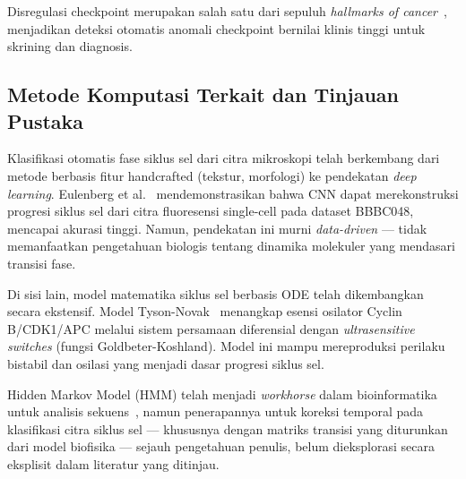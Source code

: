 \documentclass[conference]{IEEEtran}
\begin{document}
Disregulasi checkpoint merupakan salah satu dari sepuluh \textit{hallmarks of cancer}~\cite{hanahan2011}, menjadikan deteksi otomatis anomali checkpoint bernilai klinis tinggi untuk skrining dan diagnosis.

\subsection{Metode Komputasi Terkait dan Tinjauan Pustaka}

Klasifikasi otomatis fase siklus sel dari citra mikroskopi telah berkembang dari metode berbasis fitur handcrafted (tekstur, morfologi) ke pendekatan \textit{deep learning}. Eulenberg et al.~\cite{eulenberg2017} mendemonstrasikan bahwa CNN dapat merekonstruksi progresi siklus sel dari citra fluoresensi single-cell pada dataset BBBC048, mencapai akurasi tinggi. Namun, pendekatan ini murni \textit{data-driven} --- tidak memanfaatkan pengetahuan biologis tentang dinamika molekuler yang mendasari transisi fase.

Di sisi lain, model matematika siklus sel berbasis ODE telah dikembangkan secara ekstensif. Model Tyson-Novak~\cite{tyson2001} menangkap esensi osilator Cyclin B/CDK1/APC melalui sistem persamaan diferensial dengan \textit{ultrasensitive switches} (fungsi Goldbeter-Koshland). Model ini mampu mereproduksi perilaku bistabil dan osilasi yang menjadi dasar progresi siklus sel.

Hidden Markov Model (HMM) telah menjadi \textit{workhorse} dalam bioinformatika untuk analisis sekuens~\cite{durbin1998}, namun penerapannya untuk koreksi temporal pada klasifikasi citra siklus sel --- khususnya dengan matriks transisi yang diturunkan dari model biofisika --- sejauh pengetahuan penulis, belum dieksplorasi secara eksplisit dalam literatur yang ditinjau.
\end{document}
